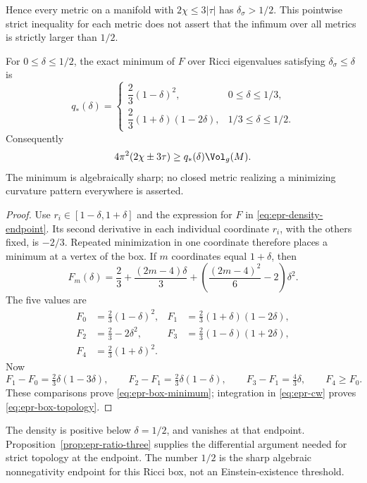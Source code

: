 Hence every metric on a manifold with $2\chi\leq3|\tau|$ has
$\delta_\sigma>1/2$.  This pointwise strict inequality for each
metric does not assert that the infimum over all metrics is strictly
larger than $1/2$.

\begin{lemma}
\label{lem:epr-ricci-box}
For $0\leq\delta\leq1/2$, the exact minimum of $F$ over Ricci
eigenvalues satisfying $\delta_\sigma\leq\delta$ is
\begin{equation}\label{eq:epr-box-minimum}
 q_*(\delta)=
 \begin{cases}
  \dfrac23(1-\delta)^2,&0\leq\delta\leq1/3,\\[1mm]
  \dfrac23(1+\delta)(1-2\delta),&1/3\leq\delta\leq1/2.
 \end{cases}
\end{equation}
Consequently
\begin{equation}\label{eq:epr-box-topology}
 4\pi^2(2\chi\pm3\tau)\geq q_*(\delta)\Vol_g(M).
\end{equation}
The minimum is algebraically sharp; no closed metric realizing a
minimizing curvature pattern everywhere is asserted.
\end{lemma}

\begin{proof}
Use $r_i\in[1-\delta,1+\delta]$ and the expression for $F$ in
\eqref{eq:epr-density-endpoint}.  Its second derivative in each
individual coordinate $r_i$, with the others fixed, is $-2/3$.
Repeated minimization in one coordinate therefore places a minimum
at a vertex of the box.  If $m$ coordinates equal $1+\delta$, then
\[
 F_m(\delta)=\frac23+\frac{(2m-4)\delta}{3}
       +\left(\frac{(2m-4)^2}{6}-2\right)\delta^2.
\]
The five values are
\begin{align*}
 F_0&=\tfrac23(1-\delta)^2,
 &F_1&=\tfrac23(1+\delta)(1-2\delta),\\
 F_2&=\tfrac23-2\delta^2,
 &F_3&=\tfrac23(1-\delta)(1+2\delta),\\
 F_4&=\tfrac23(1+\delta)^2.
\end{align*}
Now
\[
 F_1-F_0=\tfrac23\delta(1-3\delta),\qquad
 F_2-F_1=\tfrac23\delta(1-\delta),\qquad
 F_3-F_1=\tfrac43\delta,\qquad F_4\geq F_0.
\]
These comparisons prove \eqref{eq:epr-box-minimum}; integration in
\eqref{eq:epr-cw} proves \eqref{eq:epr-box-topology}.
\end{proof}

The density is positive below $\delta=1/2$, and vanishes at that
endpoint.  Proposition~\ref{prop:epr-ratio-three} supplies the
differential argument needed for strict topology at the endpoint.
The number $1/2$ is the sharp algebraic nonnegativity endpoint for
this Ricci box, not an Einstein-existence threshold.

